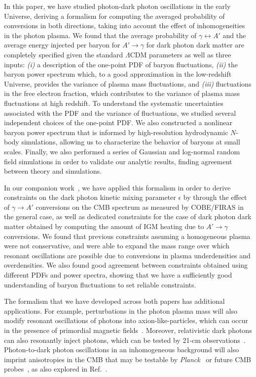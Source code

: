 \documentclass[prd,aps,10pt,nofootinbib,twocolumn,superscriptaddress,preprintnumbers,balancelastpage,longbibliography]{revtex4-1}
\begin{document}
In this paper, we have studied photon-dark photon oscillations in the early Universe, deriving a formalism for computing the averaged probability of conversions in both directions, taking into account the effect of inhomogeneities in the photon plasma. 
We found that the average probability of $\gamma \leftrightarrow A'$ and the average energy injected per baryon for $A' \to \gamma$ for dark photon dark matter are completely specified given the standard $\Lambda$CDM parameters as well as three inputs: \emph{(i)} a description of the one-point PDF of baryon fluctuations, \emph{(ii)} the baryon power spectrum which, to a good approximation in the low-redshift Universe, provides the variance of plasma mass fluctuations, and \emph{(iii)} fluctuations in the free electron fraction, which contributes to the variance of plasma mass fluctuations at high redshift. To understand the systematic uncertainties associated with the PDF and the variance of fluctuations, we studied several independent choices of the one-point PDF. 
We also constructed a nonlinear baryon power spectrum that is informed by high-resolution hydrodynamic $N$-body simulations, allowing us to characterize the behavior of baryons at small scales. 
Finally, we also performed a series of Gaussian and log-normal random field simulations in order to validate our analytic results, finding agreement between theory and simulations. 

In our companion work~, we have applied this formalism in order to derive constraints on the dark photon kinetic mixing parameter $\epsilon$ by through the effect of $\gamma \to A'$ conversions on the CMB spectrum as measured by COBE/FIRAS in the general case, as well as dedicated constraints for the case of dark photon dark matter obtained by computing the amount of IGM heating due to $A' \to \gamma$ conversions. 
We found that previous constraints assuming a homogeneous plasma were not conservative, and were able to expand the mass range over which resonant oscillations are possible due to conversions in plasma underdensities and overdensities. 
We also found good agreement between constraints obtained using different PDFs and power spectra, showing that we have a sufficiently good understanding of baryon fluctuations to set reliable constraints. 

The formalism that we have developed across both papers has additional applications. For example, perturbations in the photon plasma mass will also modify resonant oscillations of photons into axion-like-particles, which can occur in the presence of primordial magnetic fields~\cite{Mirizzi:2009nq}. Moreover, relativistic dark photons can also resonantly inject photons, which can be tested by 21-cm observations~\cite{Choi:2019jwx,Pospelov:2018kdh,Moroi:2018vci}. Photon-to-dark photon oscillations in an inhomogeneous background will also imprint anisotropies in the CMB that may be testable by \emph{Planck}~\cite{Aghanim:2019ame} or future CMB probes~\cite{Abazajian:2016yjj}, as also explored in Ref.~\cite{Garcia:2020qrp}. 
\end{document}
